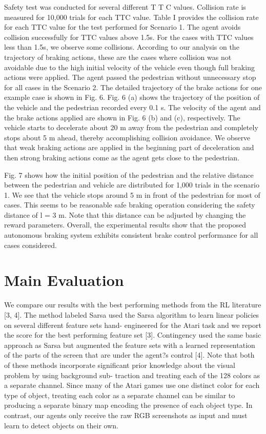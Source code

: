Safety test was conducted for several different T T C values. Collision rate is measured for 10,000 trials for each TTC value. Table I provides the collision rate for each TTC value for the test performed for Scenario 1. The agent avoids collision successfully for TTC values above 1.5s. For the cases with TTC values less than 1.5s, we observe some collisions. According to our analysis on the trajectory of braking actions, these are the cases where collision was not avoidable due to the high initial velocity of the vehicle even though full braking actions were applied. The agent passed the pedestrian without unnecessary stop for all cases in the Scenario 2. The detailed trajectory of the brake actions for one example case is shown in Fig. 6. Fig. 6 (a) shows the trajectory of the position of the vehicle and the pedestrian recorded every 0.1 s. The velocity of the agent and the brake actions applied are shown in Fig. 6 (b) and (c), respectively. The vehicle starts to decelerate about 20 m away from the pedestrian and completely stops about 5 m ahead, thereby accomplishing collision avoidance. We observe that weak braking actions are applied in the beginning part of deceleration and then strong braking actions come as the agent gets close to the pedestrian.

Fig. 7 shows how the initial position of the pedestrian and the relative distance between the pedestrian and vehicle are distributed for 1,000 trials in the scenario 1. We see that the vehicle stops around 5 m in front of the pedestrian for most of cases. This seems to be reasonable safe braking operation considering the safety distance of l = 3 m. Note that this distance can be adjusted by changing the reward parameters. Overall, the experimental results show that the proposed autonomous braking system exhibits consistent brake control performance for all cases considered.

\section{Main Evaluation}

We compare our results with the best performing methods from the RL literature [3, 4]. The method labeled Sarsa used the Sarsa algorithm to learn linear policies on several different feature sets hand- engineered for the Atari task and we report the score for the best performing feature set [3]. Contingency used the same basic approach as Sarsa but augmented the feature sets with a learned representation of the parts of the screen that are under the agent?s control [4]. Note that both of these methods incorporate significant prior knowledge about the visual problem by using background sub- traction and treating each of the 128 colors as a separate channel. Since many of the Atari games use one distinct color for each type of object, treating each color as a separate channel can be similar to producing a separate binary map encoding the presence of each object type. In contrast, our agents only receive the raw RGB screenshots as input and must learn to detect objects on their own.


